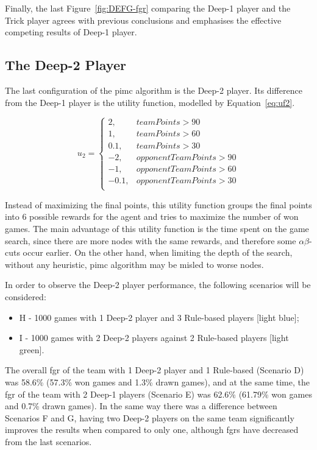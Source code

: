 Finally, the last Figure~\ref{fig:DEFG-fgr} comparing the Deep-1 player and the Trick player agrees with previous conclusions and emphasises the effective competing results of Deep-1 player.


\subsection{The Deep-2 Player}

The last configuration of the \ac{pimc} algorithm is the Deep-2 player.
Its difference from the Deep-1 player is the utility function, modelled by Equation~\ref{eq:uf2}.

\begin{equation} \label{eq:uf2}
u_2 = \left\{
                \begin{array}{ll}
                  2, & teamPoints > 90\\
                  1, & teamPoints > 60\\
                  0.1, & teamPoints > 30\\
                  -2, & opponentTeamPoints >90\\
                  -1, & opponentTeamPoints > 60\\
                  -0.1, & opponentTeamPoints > 30\\
                \end{array}
              \right.
\end{equation}

Instead of maximizing the final points, this utility function groups the final points into 6 possible rewards for the agent and tries to maximize the number of won games.
The main advantage of this utility function is the time spent on the game search, since there are more nodes with the same rewards, and therefore some $\alpha\beta$-cuts occur earlier.
On the other hand, when limiting the depth of the search, without any heuristic, \ac{pimc} algorithm may be misled to worse nodes.

In order to observe the Deep-2 player performance, the following scenarios will be considered:
\begin{itemize}
\item H - 1000 games with 1 Deep-2 player and 3 Rule-based players [light blue];
\item I - 1000 games with 2 Deep-2 players against 2 Rule-based players [light green].
\end{itemize}

The overall \ac{fgr} of the team with 1 Deep-2 player and 1 Rule-based (Scenario D) was 58.6\% (57.3\% won games and 1.3\% drawn games), and at the same time, the \ac{fgr} of the team with 2 Deep-1 players (Scenario E) was 62.6\% (61.79\% won games and 0.7\% drawn games).
In the same way there was a difference between Scenarios F and G, having two Deep-2 players on the same team significantly improves the results when compared to only one, although \acp{fgr} have decreased from the last scenarios.

